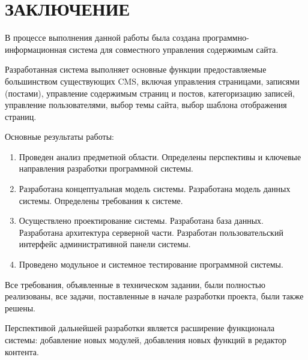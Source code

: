 \section*{ЗАКЛЮЧЕНИЕ}
В процессе выполнения данной работы была создана программно-информационная система для совместного управления содержимым сайта.

Разработанная система выполняет основные функции предоставляемые большинством существующих CMS, включая управления страницами, записями (постами), управление содержимым страниц и постов, категоризацию записей, управление пользователями, выбор темы сайта, выбор шаблона отображения страниц.

Основные результаты работы:

\begin{enumerate}
\item Проведен анализ предметной области. Определены перспективы и ключевые направления разработки программной системы.
\item Разработана концептуальная модель системы. Разработана модель данных системы. Определены требования к системе.
\item Осуществлено проектирование системы. Разработана база данных. Разработана архитектура серверной части. Разработан пользовательский интерфейс административной панели системы.
\item Проведено модульное и системное тестирование программной системы.
\end{enumerate}

Все требования, объявленные в техническом задании, были полностью реализованы, все задачи, поставленные в начале разработки проекта, были также решены.

Перспективой дальнейшей разработки является расширение функционала системы: добавление новых модулей, добавления новых функций в редактор контента.